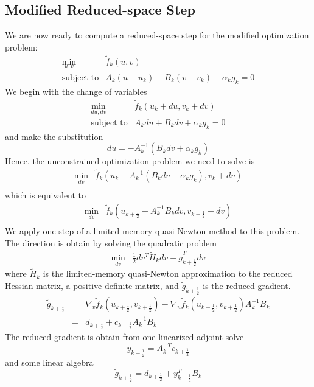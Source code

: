 \subsection{Modified Reduced-space Step}
We are now ready to compute a reduced-space step for the modified
optimization problem:
\[
\begin{array}{ll}
\displaystyle \min_{u,v} & \tilde{f}_k(u, v) \\
\mbox{subject to} & A_k (u-u_k) + B_k (v-v_k) + \alpha_k g_k = 0
\end{array}
\]
We begin with the change of variables
\[
\begin{array}{ll}
\displaystyle \min_{du,dv} & \tilde{f}_k(u_k+du, v_k+dv) \\
\mbox{subject to} & A_k du + B_k dv + \alpha_k g_k = 0
\end{array}
\]
and make the substitution
\[
  du = -A_k^{-1}(B_k dv + \alpha_k g_k)
\]
Hence, the unconstrained optimization problem we need to solve is
\[
\begin{array}{ll}
\displaystyle \min_{dv} & \tilde{f}_k(u_k-A_k^{-1}(B_k dv + \alpha_k g_k), v_k+dv) \\
\end{array}
\]
which is equivalent to
\[
\begin{array}{ll}
\displaystyle \min_{dv} & \tilde{f}_k(u_{k+\frac{1}{2}} - A_k^{-1} B_k dv, v_{k+\frac{1}{2}}+dv) \\
\end{array}
\]
We apply one step of a limited-memory quasi-Newton method to this
problem.  The direction is obtain by solving the quadratic problem
\[
\begin{array}{ll}
\displaystyle \min_{dv} & \frac{1}{2} dv^T \tilde{H}_k dv + \tilde{g}_{k+\frac{1}{2}}^T dv
\end{array}
\]
where $\tilde{H}_k$ is the limited-memory quasi-Newton approximation
to the reduced Hessian matrix, a positive-definite matrix, and 
$\tilde{g}_{k+\frac{1}{2}}$ is the reduced gradient.
\[
\begin{array}{lcl}
\tilde{g}_{k+\frac{1}{2}} & = & \nabla_v \tilde{f}_k(u_{k+\frac{1}{2}}, v_{k+\frac{1}{2}}) -
	      \nabla_u \tilde{f}_k(u_{k+\frac{1}{2}}, v_{k+\frac{1}{2}}) A_k^{-1} B_k \\
	   & = & d_{k+\frac{1}{2}} + c_{k+\frac{1}{2}} A_k^{-1} B_k
\end{array}
\]
The reduced gradient is obtain from one linearized adjoint solve
\[
y_{k+\frac{1}{2}} = A_k^{-T}c_{k+\frac{1}{2}}
\]
and some linear algebra
\[
\tilde{g}_{k+\frac{1}{2}} = d_{k+\frac{1}{2}} + y_{k+\frac{1}{2}}^T B_k
\]
